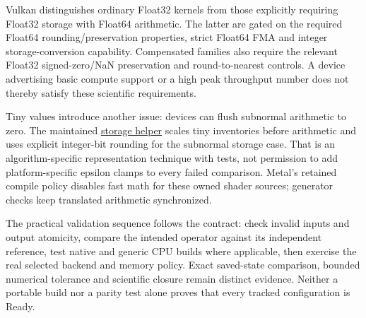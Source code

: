 Vulkan distinguishes ordinary Float32 kernels from those explicitly requiring
Float32 storage with Float64 arithmetic. The latter are gated on the required
Float64 rounding/preservation properties, strict Float64 FMA and integer
storage-conversion capability. Compensated families also require the relevant
Float32 signed-zero/NaN preservation and round-to-nearest controls. A device
advertising basic compute support or a high peak throughput number does not
thereby satisfy these scientific requirements.

Tiny values introduce another issue: devices can flush subnormal arithmetic
to zero. The maintained
\href{../vulkan/shaders/compute/terrain/compensated_storage.glsl}{storage helper}
scales tiny inventories before arithmetic and uses explicit integer-bit
rounding for the subnormal storage case. That is an algorithm-specific
representation technique with tests, not permission to add platform-specific
epsilon clamps to every failed comparison. Metal's retained compile policy
disables fast math for these owned shader sources; generator checks keep
translated arithmetic synchronized.

The practical validation sequence follows the contract: check invalid inputs
and output atomicity, compare the intended operator against its independent
reference, test native and generic CPU builds where applicable, then exercise
the real selected backend and memory policy. Exact saved-state comparison,
bounded numerical tolerance and scientific closure remain distinct evidence.
Neither a portable build nor a parity test alone proves that every tracked
configuration is Ready.
